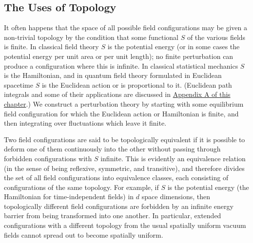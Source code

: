 \subsection{The Uses of Topology}
\label{sec:23.1}

It often happens that the space of all possible field configurations may be
given a non-trivial topology by the condition that some functional $S$ of
the various fields is finite. In classical field theory $S$ is the potential
energy (or in some cases the potential energy per unit area or per unit
length); no finite perturbation can produce a configuration where this is
infinite. In classical statistical mechanics $S$ is the Hamiltonian, and in
quantum field theory formulated in Euclidean spacetime $S$ is the Euclidean
action or is proportional to it. (Euclidean path integrals and some of their
applications are discussed in
\hyperref[app:23.A]{Appendix A of this chapter}.) We construct a
perturbation theory by starting with some equilibrium field configuration
for which the Euclidean action or Hamiltonian is finite, and then integrating
over fluctuations which leave it finite.

Two field configurations are said to be topologically equivalent if it is
possible to deform one of them continuously into the other without passing
through forbidden configurations with $S$ infinite. This is evidently an
equivalence relation (in the sense of being reflexive, symmetric, and
transitive), and therefore divides the set of all field configurations into
equivalence classes, each consisting of configurations of the same
topology. For example, if $S$ is the potential energy (the Hamiltonian for
time-independent fields) in $d$ space dimensions, then topologically
different field configurations are forbidden by an infinite energy barrier
from being transformed into one another. In particular, extended
configurations with a different topology from the usual spatially uniform
vacuum fields cannot spread out to become spatially uniform.

